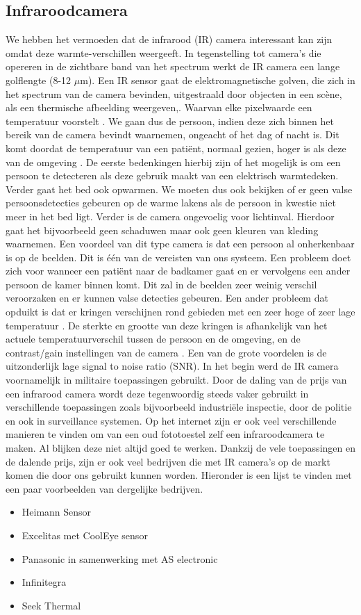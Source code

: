 \subsection{Infraroodcamera}
\label{refIRC}
We hebben het vermoeden dat de infrarood (IR) camera interessant kan zijn omdat deze warmte-verschillen weergeeft. In tegenstelling tot camera's die opereren in de zichtbare band van het spectrum werkt de IR camera  een lange golflengte (8-12 $\mu$m). Een IR sensor gaat de elektromagnetische golven, die zich in het spectrum van de  camera bevinden, uitgestraald door objecten in een sc\`ene, als een thermische afbeelding weergeven,. Waarvan elke pixelwaarde een temperatuur voorstelt \cite{bibIRC2}. We gaan dus de persoon, indien deze zich binnen het bereik van de camera bevindt waarnemen, ongeacht of het dag of nacht is. Dit komt doordat de temperatuur van een pati\"ent, normaal gezien, hoger is als deze van de omgeving \cite{bibIRC3}.
De eerste bedenkingen hierbij zijn of het mogelijk is om een persoon te detecteren als deze gebruik maakt van een elektrisch warmtedeken. Verder gaat het bed ook opwarmen. We moeten dus ook bekijken of er geen valse persoonsdetecties gebeuren op de warme lakens als de persoon in kwestie niet meer in het bed ligt. Verder is de camera ongevoelig voor lichtinval. Hierdoor gaat het bijvoorbeeld geen schaduwen maar ook geen kleuren van kleding waarnemen. Een voordeel van dit type camera is dat een persoon al onherkenbaar is op de beelden. Dit is \'e\'en van de vereisten van ons systeem. Een probleem doet zich voor wanneer een pati\"ent naar de badkamer gaat en er vervolgens een ander persoon de kamer binnen komt. Dit  zal in de beelden zeer weinig verschil veroorzaken en er kunnen valse detecties gebeuren.  Een ander probleem dat opduikt is dat er kringen verschijnen rond gebieden met een zeer hoge of zeer lage temperatuur \cite{bibIRC4}. De sterkte en grootte van deze kringen is afhankelijk van het actuele temperatuurverschil tussen de persoon en de omgeving, en de contrast/gain instellingen van de camera \cite{bibBET6}. Een van de grote voordelen is de uitzonderlijk lage signal to noise ratio (SNR). In het begin werd de IR camera voornamelijk in militaire toepassingen gebruikt. Door de daling van de prijs van een infrarood camera wordt deze tegenwoordig steeds vaker gebruikt in verschillende toepassingen zoals bijvoorbeeld industri\"ele inspectie, door de politie en ook in surveillance systemen\cite{bibBET6}. Op het internet zijn er ook veel verschillende manieren te vinden om van een oud fototoestel zelf een infraroodcamera te maken. Al blijken deze niet altijd goed te werken.
Dankzij de vele toepassingen en de dalende prijs, zijn er ook veel bedrijven die met IR camera's op de markt komen die door ons gebruikt kunnen worden. Hieronder is een lijst te vinden met een paar voorbeelden van dergelijke bedrijven.
\begin{itemize}
	\item Heimann Sensor
	\item Excelitas met CoolEye sensor
	\item Panasonic in samenwerking met AS electronic
	\item Infinitegra
	\item Seek Thermal
\end{itemize}

